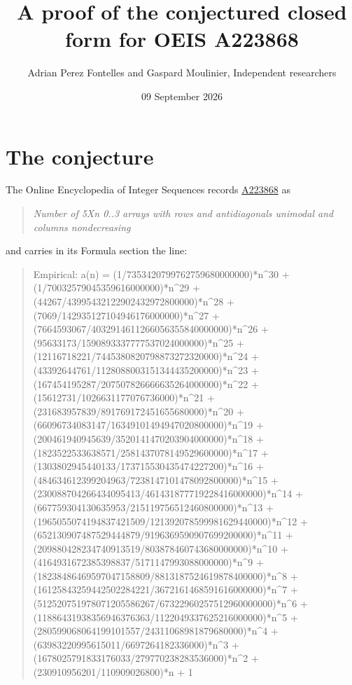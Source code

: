 \documentclass[11pt]{article}
\title{A proof of the conjectured closed form for OEIS A223868}
\author{Adrian Perez Fontelles and Gaspard Moulinier, Independent researchers}
\date{09 September 2026}
\theoremstyle{definition}
\begin{document}
\maketitle
\section{The conjecture}

The Online Encyclopedia of Integer Sequences records \href{https://oeis.org/A223868}{A223868} as

\begin{quote}\itshape Number of 5Xn 0..3 arrays with rows and antidiagonals unimodal and columns nondecreasing\end{quote}

and carries in its Formula section the line:

\begin{quote}\ttfamily Empirical: a(n) = (1/7353420799762759680000000)*n\textasciicircum{}30 + (1/70032579045359616000000)*n\textasciicircum{}29 + (44267/43995432122902432972800000)*n\textasciicircum{}28 + (7069/142935127104946176000000)*n\textasciicircum{}27 + (7664593067/4032914611266056355840000000)*n\textasciicircum{}26 + (95633173/1590893337777537024000000)*n\textasciicircum{}25 + (12116718221/7445380820798873272320000)*n\textasciicircum{}24 + (43392644761/1128088003151344435200000)*n\textasciicircum{}23 + (167454195287/207507826666635264000000)*n\textasciicircum{}22 + (15612731/1026631177076736000)*n\textasciicircum{}21 + (231683957839/891769172451655680000)*n\textasciicircum{}20 + (66096734083147/16349101494947020800000)*n\textasciicircum{}19 + (200461940945639/3520141470203904000000)*n\textasciicircum{}18 + (1823522533638571/2581437078149529600000)*n\textasciicircum{}17 + (1303802945440133/173715530435474227200)*n\textasciicircum{}16 + (484634612399204963/7238147101478092800000)*n\textasciicircum{}15 + (230088704266434095413/461431877719228416000000)*n\textasciicircum{}14 + (667759304130635953/215119756512460800000)*n\textasciicircum{}13 + (1965055074194837421509/121392078599981629440000)*n\textasciicircum{}12 + (652130907487529444879/9196369590907699200000)*n\textasciicircum{}11 + (209880428234740913519/803878460743680000000)*n\textasciicircum{}10 + (4164931672385398837/5171147993088000000)*n\textasciicircum{}9 + (18238486469597047158809/8813187524619878400000)*n\textasciicircum{}8 + (16125843259442502284221/3672161468591616000000)*n\textasciicircum{}7 + (512520751978071205586267/67322960257512960000000)*n\textasciicircum{}6 + (11886431938356946376363/1122049337625216000000)*n\textasciicircum{}5 + (280599068064199101557/24311068981879680000)*n\textasciicircum{}4 + (63983220995615011/6697264182336000)*n\textasciicircum{}3 + (1678025791833176033/279770238283536000)*n\textasciicircum{}2 + (230910956201/110909026800)*n + 1\end{quote}
\end{document}
